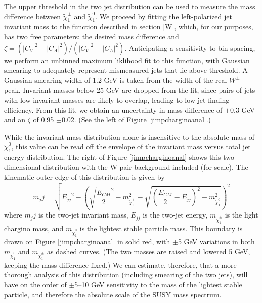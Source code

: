 \documentclass[12pt]{article}
\begin{document}
The upper threshold in the two jet distribution can be used to measure
the mass difference between $\tilde{\chi}^\pm_1$ and
$\tilde{\chi}^0_1$.  We proceed by fitting the left-polarized jet
invariant mass to the function described in section \ref{W}, which,
for our purposes, has two free parameters: the desired mass difference
and $\zeta = (|C_V|^2 - |C_A|^2)/(|C_V|^2 + |C_A|^2)$.  Anticipating a
sensitivity to bin spacing, we perform an unbinned maximum liklihood
fit to this function, with Gaussian smearing to adequately represent
mismeasured jets that lie above threshold.  A Gaussian smearing width
of 1.2 GeV is taken from the width of the real $W^\pm$ peak.
Invariant masses below 25 GeV are dropped from the fit, since pairs of
jets with low invariant masses are likely to overlap, leading to low
jet-finding efficiency.  From this fit, we obtain an uncertainty in
mass difference of $\pm$0.3 GeV and an $\zeta$ of 0.95 $\pm$0.02.
(See the left of Figure \ref{jimpcharginoanal}.)

While the invariant mass distribution alone is insensitive to the
absolute mass of $\tilde{\chi}^0_1$, this value can be read off the
envelope of the invariant mass versus total jet energy distribution.
The right of Figure \ref{jimpcharginoanal} shows this two-dimensional
distribution with the W-pair background included (for scale).  The
kinematic outer edge of this distribution is given by
\begin{equation}
  m_jj = \sqrt{\mbox{$E_{jj}$}^2-\left(\sqrt{\frac{E_{CM}}{2}^2-m_{\tilde{\chi}^\pm_1}^2}-\sqrt{\left(\frac{E_{CM}}{2}-E_{jj}\right)^2-m_{\tilde{\chi}^0_1}^2}\right)^2}
\end{equation}
where $m_jj$ is the two-jet invariant mass, $E_{jj}$ is the two-jet
energy, $m_{\tilde{\chi}^\pm_1}$ is the light chargino mass, and
$m_{\tilde{\chi}^0_1}$ is the lightest stable particle mass.  This
boundary is drawn on Figure \ref{jimpcharginoanal} in solid red, with
$\pm$5 GeV variations in both $m_{\tilde{\chi}^0_1}$ and
$m_{\tilde{\chi}^\pm_1}$ as dashed curves.  (The two masses are raised
and lowered 5 GeV, keeping the mass difference fixed.)  We can
estimate, therefore, that a more thorough analysis of this
distribution (including smearing of the two jets), will have on the
order of $\pm$5--10 GeV sensitivity to the mass of the lightest stable
particle, and therefore the absolute scale of the SUSY mass spectrum.
\end{document}
